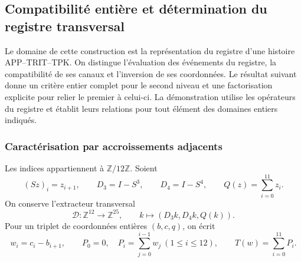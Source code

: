 \subsection{Compatibilité entière et détermination du registre transversal}
\label{img09:seccion}

Le domaine de cette construction est la représentation du registre d’une
histoire APP--TRIT--TPK. On distingue l’évaluation des événements du
registre, la compatibilité de ses canaux et l’inversion de ses
coordonnées. Le résultat suivant donne un critère entier complet pour
le second niveau et une factorisation explicite pour relier le premier à celui-ci.
La démonstration utilise les opérateurs du registre et établit leurs
relations pour tout élément des domaines entiers indiqués.

\subsubsection{Caractérisation par accroissements adjacents}

Les indices appartiennent à $\mathbb Z/12\mathbb Z$. Soient
\[
 (Sz)_i=z_{i+1},\qquad D_3=I-S^3,\qquad D_4=I-S^4,
 \qquad Q(z)=\sum_{i=0}^{11}z_i.
\]
On conserve l'extracteur transversal
\[
 \mathcal D:\mathbb Z^{12}\longrightarrow\mathbb Z^{25},
 \qquad k\longmapsto(D_3k,D_4k,Q(k)).
\]
Pour un triplet de coordonnées entières $(b,c,q)$, on écrit
\begin{equation}
 w_i=c_i-b_{i+1},\qquad
 P_0=0,\quad P_i=\sum_{j=0}^{i-1}w_j\ (1\leq i\leq12),
 \qquad T(w)=\sum_{i=0}^{11}P_i.
 \label{img09:incremento}
\end{equation}

